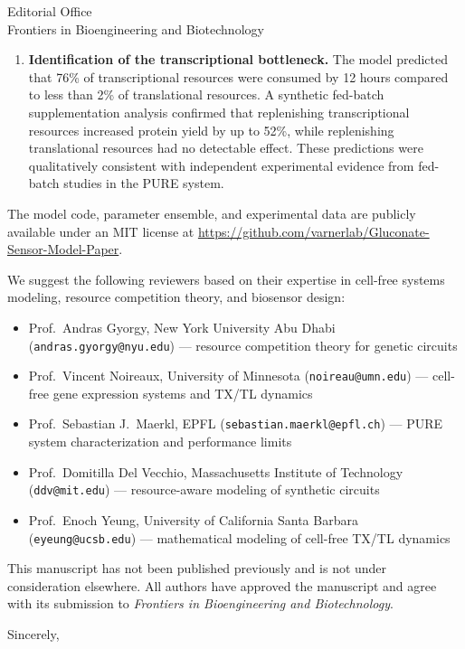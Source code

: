 \documentclass[11pt]{letter}
\begin{document}
\begin{letter}{Editorial Office\\Frontiers in Bioengineering and Biotechnology}
\begin{enumerate}
\item \textbf{Identification of the transcriptional bottleneck.} The model predicted that 76\% of transcriptional resources were consumed by 12 hours compared to less than 2\% of translational resources. A synthetic fed-batch supplementation analysis confirmed that replenishing transcriptional resources increased protein yield by up to 52\%, while replenishing translational resources had no detectable effect. These predictions were qualitatively consistent with independent experimental evidence from fed-batch studies in the PURE system.
\end{enumerate}

The model code, parameter ensemble, and experimental data are publicly available under an MIT license at \url{https://github.com/varnerlab/Gluconate-Sensor-Model-Paper}.

We suggest the following reviewers based on their expertise in cell-free systems modeling, resource competition theory, and biosensor design:

\begin{itemize}
\item Prof.\ Andras Gyorgy, New York University Abu Dhabi (\texttt{andras.gyorgy@nyu.edu}) --- resource competition theory for genetic circuits
\item Prof.\ Vincent Noireaux, University of Minnesota (\texttt{noireau@umn.edu}) --- cell-free gene expression systems and TX/TL dynamics
\item Prof.\ Sebastian J.\ Maerkl, EPFL (\texttt{sebastian.maerkl@epfl.ch}) --- PURE system characterization and performance limits
\item Prof.\ Domitilla Del Vecchio, Massachusetts Institute of Technology (\texttt{ddv@mit.edu}) --- resource-aware modeling of synthetic circuits
\item Prof.\ Enoch Yeung, University of California Santa Barbara (\texttt{eyeung@ucsb.edu}) --- mathematical modeling of cell-free TX/TL dynamics
\end{itemize}

This manuscript has not been published previously and is not under consideration elsewhere. All authors have approved the manuscript and agree with its submission to \textit{Frontiers in Bioengineering and Biotechnology}.

\longindentation=0pt
\closing{Sincerely,}

\end{letter}
\end{document}
